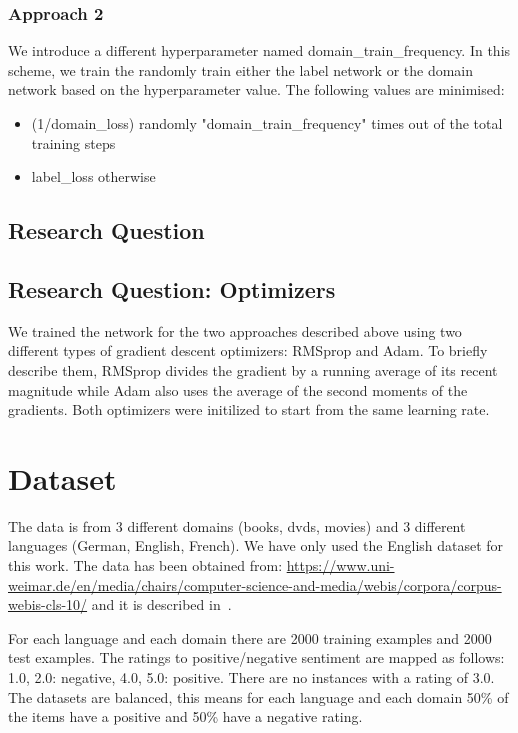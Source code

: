 \documentclass[11pt,a4paper]{article}
\begin{document}
\subsubsection{Approach 2}
We introduce a different hyperparameter named domain\_train\_frequency. In this scheme, we train the randomly train either the label network or the domain network based on the hyperparameter value. The following values are minimised:

\begin{itemize}
  \item (1/domain\_loss) randomly "domain\_train\_frequency" times out of the total training steps
  \item label\_loss otherwise
\end{itemize}

\subsection{Research Question}

\subsection{Research Question: Optimizers}
We trained the network for the two approaches described above using two different types of gradient descent optimizers: RMSprop and Adam. To briefly describe them, RMSprop divides the gradient by a running average of its recent magnitude while Adam also uses the average of the second moments of the gradients. Both optimizers were initilized to start from the same learning rate.


\section{Dataset}
The data is from 3 different domains (books, dvds, movies) and 3 different languages (German, English, French).
We have only used the English dataset for this work. The data has been obtained from: \url{https://www.uni-weimar.de/en/media/chairs/computer-science-and-media/webis/corpora/corpus-webis-cls-10/} and it is described in~\cite{PB:2010}.

For each language and each domain there are 2000 training examples and 2000 test examples. The ratings to positive/negative sentiment are mapped as follows: 1.0, 2.0: negative, 4.0, 5.0: positive. There are no instances with a rating of 3.0. The datasets are balanced, this means for each language and each domain 50\% of the items have a positive and 50\% have a negative rating.
\end{document}
